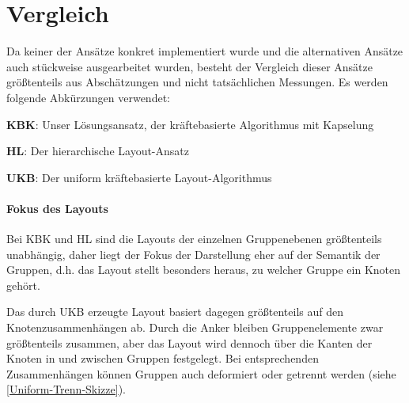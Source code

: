 \section{Vergleich} 
\label{Ansatz-Vergleich}
Da keiner der Ansätze konkret implementiert wurde und die alternativen Ansätze auch stückweise ausgearbeitet wurden, besteht der Vergleich dieser Ansätze größtenteils aus Abschätzungen und nicht tatsächlichen Messungen. Es werden folgende Abkürzungen verwendet:

\textbf{KBK}: Unser Lösungsansatz, der kräftebasierte Algorithmus mit Kapselung

\textbf{HL}: Der hierarchische Layout-Ansatz

\textbf{UKB}: Der uniform kräftebasierte Layout-Algorithmus

\paragraph*{Fokus des Layouts}
Bei KBK und HL sind die Layouts der einzelnen Gruppenebenen größtenteils unabhängig, daher liegt der Fokus der Darstellung eher auf der Semantik der Gruppen, d.h. das Layout stellt besonders heraus, zu welcher Gruppe ein Knoten gehört.

Das durch UKB erzeugte Layout basiert dagegen größtenteils auf den Knotenzusammenhängen ab. Durch die Anker bleiben Gruppenelemente zwar größtenteils zusammen, aber das Layout wird dennoch über die Kanten der Knoten in und zwischen Gruppen festgelegt. Bei entsprechenden Zusammenhängen können Gruppen auch deformiert oder getrennt werden (siehe \autoref{Uniform-Trenn-Skizze}).

